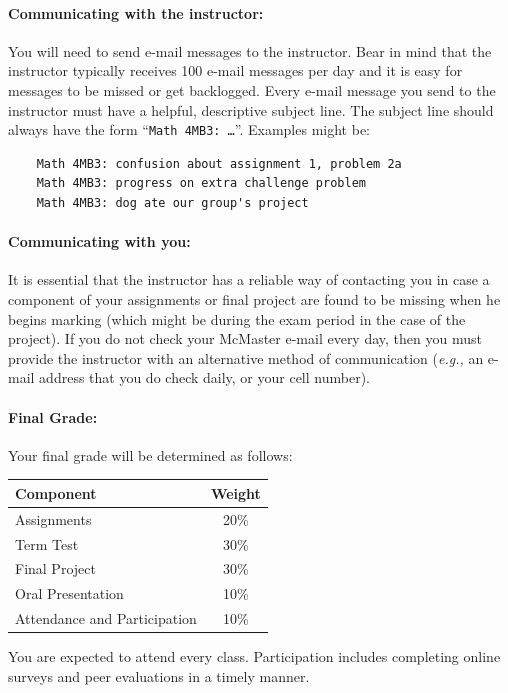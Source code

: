 \documentclass[12pt]{article}
\begin{document}
\begin{center}
\paragraph*{Communicating with the instructor:}

You will need to send e-mail messages to the instructor.  Bear in mind that the instructor typically receives 100 e-mail messages per day and it is easy for messages to be missed or get backlogged.  Every e-mail message you send to the instructor must have a helpful, descriptive subject line.  The subject line should always have the form ``{\tt Math 4MB3: \dots}''.  Examples might be:
\begin{verbatim}
    Math 4MB3: confusion about assignment 1, problem 2a
    Math 4MB3: progress on extra challenge problem
    Math 4MB3: dog ate our group's project
\end{verbatim}

\paragraph*{Communicating with you:}

It is essential that the instructor has a reliable way of contacting you in case a component of your assignments or final project are found to be missing when he begins marking (which might be during the exam period in the case of the project).  If you do not check your McMaster e-mail every day, then you must provide the instructor with an alternative method of communication (\emph{e.g.,} an e-mail address that you do check daily, or your cell number).

\paragraph*{Final Grade:}
Your final grade will be determined as follows:
%
\begin{center}
\begin{tabular}{l|c}
\bf Component & \bf Weight \\\hline
Assignments & 20\% \\
Term Test & 30\% \\
Final Project & 30\% \\
Oral Presentation & 10\% \\
Attendance and Participation & 10\% \\
\end{tabular}
\end{center}
\noindent You are expected to attend every class.  Participation
includes completing online surveys and peer evaluations in a timely
manner.


\end{center}
\end{document}
